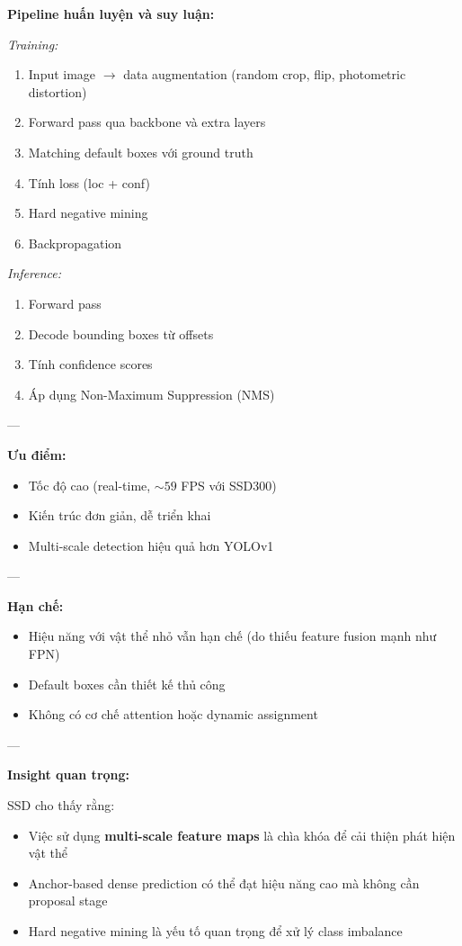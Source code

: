 \textbf{Pipeline huấn luyện và suy luận:}

\textit{Training:}
\begin{enumerate}
	\item Input image $\rightarrow$ data augmentation (random crop, flip, photometric distortion)
	\item Forward pass qua backbone và extra layers
	\item Matching default boxes với ground truth
	\item Tính loss (loc + conf)
	\item Hard negative mining
	\item Backpropagation
\end{enumerate}

\textit{Inference:}
\begin{enumerate}
	\item Forward pass
	\item Decode bounding boxes từ offsets
	\item Tính confidence scores
	\item Áp dụng Non-Maximum Suppression (NMS)
\end{enumerate}

---

\textbf{Ưu điểm:}

\begin{itemize}
	\item Tốc độ cao (real-time, $\sim 59$ FPS với SSD300)
	\item Kiến trúc đơn giản, dễ triển khai
	\item Multi-scale detection hiệu quả hơn YOLOv1
\end{itemize}

---

\textbf{Hạn chế:}

\begin{itemize}
	\item Hiệu năng với vật thể nhỏ vẫn hạn chế (do thiếu feature fusion mạnh như FPN)
	\item Default boxes cần thiết kế thủ công
	\item Không có cơ chế attention hoặc dynamic assignment
\end{itemize}

---

\textbf{Insight quan trọng:}

SSD cho thấy rằng:
\begin{itemize}
	\item Việc sử dụng \textbf{multi-scale feature maps} là chìa khóa để cải thiện phát hiện vật thể
	\item Anchor-based dense prediction có thể đạt hiệu năng cao mà không cần proposal stage
	\item Hard negative mining là yếu tố quan trọng để xử lý class imbalance
\end{itemize}

